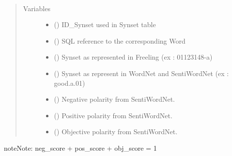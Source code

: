 \documentclass[letterpaper,10pt,english]{sphinxmanual}
\begin{document}
\begin{fulllineitems}
\label{\detokenize{index:loacore.classes.classes.Synset}}~\begin{quote}\begin{description}
\item[{Variables}] \leavevmode\begin{itemize}
\item {} 
 () \textendash{} ID\_Synset used in Synset table

\item {} 
 () \textendash{} SQL reference to the corresponding Word

\item {} 
 () \textendash{} Synset as represented in Freeling (ex : 01123148-a)

\item {} 
 () \textendash{} Synset as represent in WordNet and SentiWordNet (ex : good.a.01)

\item {} 
 () \textendash{} Negative polarity from SentiWordNet.

\item {} 
 () \textendash{} Positive polarity from SentiWordNet.

\item {} 
 () \textendash{} Objective polarity from SentiWordNet.

\end{itemize}

\end{description}\end{quote}

\begin{sphinxadmonition}{note}{Note:}
neg\_score + pos\_score + obj\_score = 1
\end{sphinxadmonition}

\end{fulllineitems}
\end{document}
